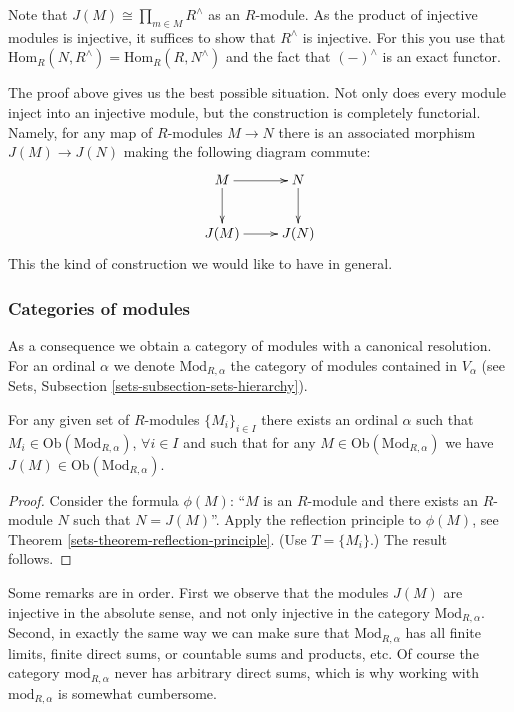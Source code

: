 \smallskip\noindent
Note that $J(M) \cong \prod_{m\in M} R^\wedge$ as an $R$-module.
As the product of injective modules is injective, it suffices to
show that $R^\wedge$ is injective. For this you use that 
$\text{Hom}_R(N, R^\wedge) = \text{Hom}_R(R, N^\wedge)$ and the
fact that $(-)^\wedge$ is an exact functor.

\smallskip\noindent
The proof above gives us the best possible situation. Not only does
every module inject into an injective module, but the construction is
completely functorial. Namely, for any map of $R$-modules $M \to N$ 
there is an associated morphism $J(M) \to J(N)$ making the following 
diagram commute:
$$
\xymatrix{
M \ar[d] \ar[r] & N \ar[d] \\
J(M) \ar[r] & J(N) }
$$
This the kind of construction we would like to have in general.

\subsubsection{Categories of modules}
\label{subsubsection-category-modules}

\noindent
As a consequence we obtain a category of modules with a canonical
resolution. For an ordinal $\alpha$ we denote $\text{Mod}_{R,\alpha}$
the category of modules contained in $V_\alpha$ (see Sets, 
Subsection \ref{sets-subsection-sets-hierarchy}).

\begin{lemma}
\label{lemma-injective-module-preserves-category}
For any given set of $R$-modules $\{M_i\}_{i\in I}$ there exists an ordinal
$\alpha$ such that $M_i \in \text{Ob}(\text{Mod}_{R,\alpha})$,
$\forall i\in I$ and such that for any
$M \in \text{Ob}(\text{Mod}_{R,\alpha})$ we have
$J(M) \in \text{Ob}(\text{Mod}_{R,\alpha})$.
\end{lemma}

\begin{proof}
Consider the formula $\phi(M)$: ``$M$ is an $R$-module and there exists
an $R$-module $N$ such that $N=J(M)$''. Apply the reflection principle to
$\phi(M)$, see  Theorem \ref{sets-theorem-reflection-principle}. (Use $T = \{M_i\}$.)
The result follows.
\end{proof}

\noindent
Some remarks are in order. First we observe that the modules $J(M)$
are injective in the absolute sense, and not only injective in the
category $\text{Mod}_{R,\alpha}$. Second, in exactly the same way we
can make sure that $\text{Mod}_{R,\alpha}$ has all finite limits,
finite direct sums, or countable sums and products, etc. Of course
the category $\text{mod}_{R,\alpha}$ never has arbitrary direct sums,
which is why working with $\text{mod}_{R,\alpha}$ is somewhat cumbersome.

